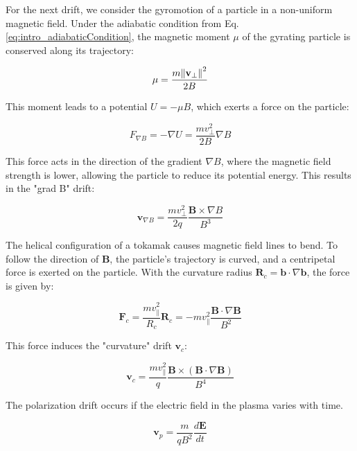 For the next drift, we consider the gyromotion of a particle in a non-uniform magnetic field. Under the adiabatic condition from Eq. \ref{eq:intro_adiabaticCondition}, the magnetic moment $\mu$ of the gyrating particle is conserved along its trajectory:

\begin{equation}
	\mu = \frac{m\norm{\mathbf{v}_\perp}^2}{2B}
\end{equation}

This moment leads to a potential $U = -\mu B$, which exerts a force on the particle:

\begin{equation}
	F_{\nabla B} = -\nabla U = \frac{mv_\perp^2}{2B}\nabla B
\end{equation}

This force acts in the direction of the gradient $\nabla B$, where the magnetic field strength is lower, allowing the particle to reduce its potential energy. This results in the "grad B" drift:

\begin{equation}
	\mathbf{v}_{\nabla B} = \frac{mv_\perp^2}{2q} \frac{\mathbf{B} \times \nabla B}{B^3}
\end{equation}

The helical configuration of a tokamak causes magnetic field lines to bend. To follow the direction of $\mathbf{B}$, the particle's trajectory is curved, and a centripetal force is exerted on the particle. With the curvature radius $\mathbf{R}_c = \mathbf{b} \cdot \nabla \mathbf{b}$, the force is given by:

\begin{equation}
	\mathbf{F}_c = \frac{mv_\parallel^2}{R_c}\mathbf{R}_c = -mv_\parallel^2\frac{\mathbf{B} \cdot \nabla \mathbf{B}}{B^2}
\end{equation}

This force induces the "curvature" drift $\mathbf{v}_c$:

\begin{equation}
	\mathbf{v}_c = \frac{mv_\parallel^2}{q}\frac{\mathbf{B} \times (\mathbf{B} \cdot \nabla \mathbf{B})}{B^4}
\end{equation}

The polarization drift occurs if the electric field in the plasma varies with time. 

\begin{equation}
	\mathbf{v}_p = \frac{m}{qB^2}\frac{d\mathbf{E}}{dt}
\end{equation}


